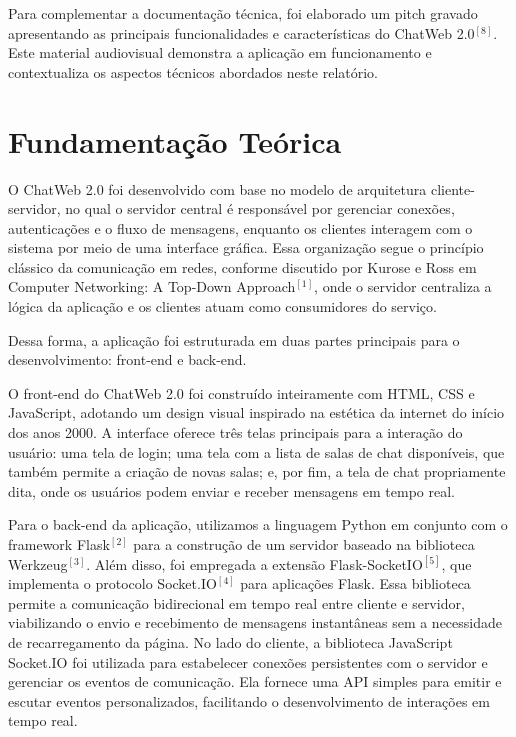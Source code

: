\documentclass[conference,compsoc]{IEEEtran}
\begin{document}
\begin{otherlanguage}{brazil}
Para complementar a documentação técnica, foi elaborado um pitch gravado apresentando as principais funcionalidades e características do ChatWeb 2.0$^{[8]}$. Este material audiovisual demonstra a aplicação em funcionamento e contextualiza os aspectos técnicos abordados neste relatório.

\section{Fundamentação Teórica}

O ChatWeb 2.0 foi desenvolvido com base no modelo de arquitetura cliente-servidor, no qual o servidor central é responsável por gerenciar conexões, autenticações e o fluxo de mensagens, enquanto os clientes interagem com o sistema por meio de uma interface gráfica. Essa organização segue o princípio clássico da comunicação em redes, conforme discutido por Kurose e Ross em Computer Networking: A Top-Down Approach$^{[1]}$, onde o servidor centraliza a lógica da aplicação e os clientes atuam como consumidores do serviço.

Dessa forma, a aplicação foi estruturada em duas partes principais para o desenvolvimento: front-end e back-end.

O front-end do ChatWeb 2.0 foi construído inteiramente com HTML, CSS e JavaScript, adotando um design visual inspirado na estética da internet do início dos anos 2000. A interface oferece três telas principais para a interação do usuário: uma tela de login; uma tela com a lista de salas de chat disponíveis, que também permite a criação de novas salas; e, por fim, a tela de chat propriamente dita, onde os usuários podem enviar e receber mensagens em tempo real.

Para o back-end da aplicação, utilizamos a linguagem Python em conjunto com o framework Flask$^{[2]}$ para a construção de um servidor baseado na biblioteca Werkzeug$^{[3]}$. Além disso, foi empregada a extensão Flask-SocketIO$^{[5]}$, que implementa o protocolo Socket.IO$^{[4]}$ para aplicações Flask. Essa biblioteca permite a comunicação bidirecional em tempo real entre cliente e servidor, viabilizando o envio e recebimento de mensagens instantâneas sem a necessidade de recarregamento da página. No lado do cliente, a biblioteca JavaScript Socket.IO foi utilizada para estabelecer conexões persistentes com o servidor e gerenciar os eventos de comunicação. Ela fornece uma API simples para emitir e escutar eventos personalizados, facilitando o desenvolvimento de interações em tempo real.


\end{otherlanguage}
\end{document}

